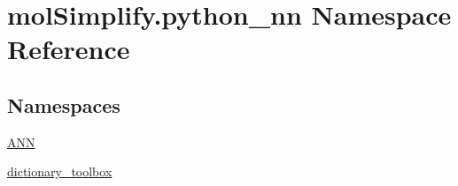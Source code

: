\hypertarget{namespacemolSimplify_1_1python__nn}{}\section{mol\+Simplify.\+python\+\_\+nn Namespace Reference}
\label{namespacemolSimplify_1_1python__nn}
\subsection*{Namespaces}
\begin{DoxyCompactItemize}
\item 
 \hyperlink{namespacemolSimplify_1_1python__nn_1_1ANN}{A\+NN}
\item 
 \hyperlink{namespacemolSimplify_1_1python__nn_1_1dictionary__toolbox}{dictionary\+\_\+toolbox}
\end{DoxyCompactItemize}

